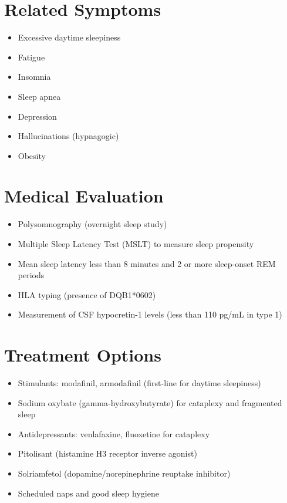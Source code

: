 \section*{Related Symptoms}
\begin{itemize}
\item Excessive daytime sleepiness
\item Fatigue
\item Insomnia
\item Sleep apnea
\item Depression
\item Hallucinations (hypnagogic)
\item Obesity
\end{itemize}

\section*{Medical Evaluation}
\begin{itemize}
\item Polysomnography (overnight sleep study)
\item Multiple Sleep Latency Test (MSLT) to measure sleep propensity
\item Mean sleep latency less than 8 minutes and 2 or more sleep-onset REM periods
\item HLA typing (presence of DQB1*0602)
\item Measurement of CSF hypocretin-1 levels (less than 110 pg/mL in type 1)
\end{itemize}

\section*{Treatment Options}
\begin{itemize}
\item Stimulants: modafinil, armodafinil (first-line for daytime sleepiness)
\item Sodium oxybate (gamma-hydroxybutyrate) for cataplexy and fragmented sleep
\item Antidepressants: venlafaxine, fluoxetine for cataplexy
\item Pitolisant (histamine H3 receptor inverse agonist)
\item Solriamfetol (dopamine/norepinephrine reuptake inhibitor)
\item Scheduled naps and good sleep hygiene
\end{itemize}

